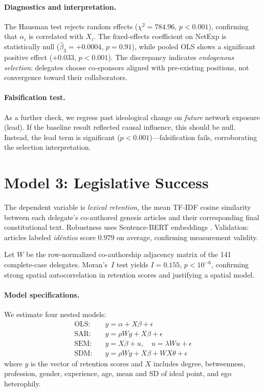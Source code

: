 \documentclass[11pt,a4paper]{article}
\begin{document}
\paragraph{Diagnostics and interpretation.} The Hausman test rejects random effects ($\chi^2 = 784.96$, $p<0.001$), confirming that $\alpha_i$ is correlated with $X_i$. The fixed-effects coefficient on NetExp is statistically null ($\hat{\beta}_3 = +0.0004$, $p = 0.91$), while pooled OLS shows a significant positive effect ($+0.033$, $p < 0.001$). The discrepancy indicates \emph{endogenous selection}: delegates choose co-sponsors aligned with pre-existing positions, not convergence toward their collaborators.

\paragraph{Falsification test.} As a further check, we regress past ideological change on \emph{future} network exposure (lead). If the baseline result reflected causal influence, this should be null. Instead, the lead term is significant ($p < 0.001$)---falsification fails, corroborating the selection interpretation.

\section{Model 3: Legislative Success}

The dependent variable is \emph{lexical retention}, the mean TF-IDF cosine similarity between each delegate's co-authored genesis articles and their corresponding final constitutional text. Robustness uses Sentence-BERT embeddings \citep{reimers2019sentence}. Validation: articles labeled \emph{id\'entico} score $0.979$ on average, confirming measurement validity.

Let $W$ be the row-normalized co-authorship adjacency matrix of the 141 complete-case delegates. Moran's~$I$ test yields $I = 0.155$, $p < 10^{-6}$, confirming strong spatial autocorrelation in retention scores and justifying a spatial model.

\paragraph{Model specifications.} We estimate four nested models:
\begin{align}
  \text{OLS:} \quad & y = \alpha + X\beta + \epsilon                               \label{eq:ols} \\
  \text{SAR:} \quad & y = \rho W y + X\beta + \epsilon                             \label{eq:sar} \\
  \text{SEM:} \quad & y = X\beta + u, \quad u = \lambda W u + \epsilon             \label{eq:sem} \\
  \text{SDM:} \quad & y = \rho W y + X\beta + W X \theta + \epsilon                \label{eq:sdm}
\end{align}
where $y$ is the vector of retention scores and $X$ includes degree, betweenness, profession, gender, experience, age, mean and SD of ideal point, and ego heterophily.
\end{document}

